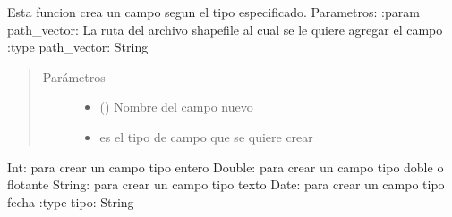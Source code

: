 \documentclass[letterpaper,10pt,spanish]{sphinxmanual}
\begin{document}
\begin{fulllineitems}
\label{\detokenize{apcsig:apcsig.crear_campo}}
Esta funcion crea un campo segun el tipo especificado.
Parametros:
:param path\_vector: La ruta del archivo shapefile al cual se le quiere                         agregar el campo
:type path\_vector: String
\begin{quote}\begin{description}
\item[{Parámetros}] \leavevmode\begin{itemize}
\item {} 
 () \textendash{} Nombre del campo nuevo

\item {} 
 \textendash{} es el tipo de campo que se quiere crear

\end{itemize}

\end{description}\end{quote}

Int: para crear un campo tipo entero
Double: para crear un campo tipo doble o flotante
String: para crear un campo tipo texto
Date: para crear un campo tipo fecha
:type tipo: String

\end{fulllineitems}

\end{document}
